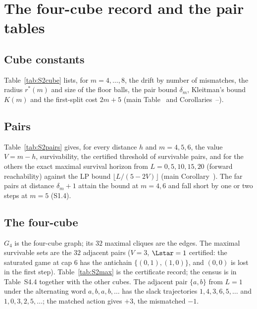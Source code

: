 \section{The four-cube record and the pair tables}\label{S:four}

\subsection{Cube constants}
Table~\ref{tab:S2cube} lists, for $m=4,\dots,8$, the drift by number of mismatches, the radius $r^\ast(m)$ and size of the floor balls, the pair bound $\delta_m$, Kleitman's bound $K(m)$ and the first-split cost $2m+5$ (main Table~ and Corollaries~--).
\begin{table}[H]\centering\small
\caption{Cube constants.}\label{tab:S2cube}

\end{table}

\subsection{Pairs}
Table~\ref{tab:S2pairs} gives, for every distance $h$ and $m=4,5,6$, the value $V=m-h$, survivability, the certified threshold of survivable pairs, and for the others the exact maximal survival horizon from $L=0,5,10,15,20$ (forward reachability) against the LP bound $\lfloor L/(5-2V)\rfloor$ (main Corollary~). The far pairs at distance $\delta_m+1$ attain the bound at $m=4,6$ and fall short by one or two steps at $m=5$ (S1.4).
\begin{table}[H]\centering\scriptsize
\caption{Pairs by distance: value, threshold, exact horizon versus LP bound.}\label{tab:S2pairs}

\end{table}

\subsection{The four-cube}
$G_4$ is the four-cube graph; its $32$ maximal cliques are the edges. The maximal survivable sets are the $32$ adjacent pairs ($V=3$, $\Lstar=1$ certified: the saturated game at cap $6$ has the antichain $\{(0,1),(1,0)\}$, and $(0,0)$ is lost in the first step). Table~\ref{tab:S2max} is the certificate record; the census is in Table~S4.4 together with the other cubes. The adjacent pair $\{a,b\}$ from $L=1$ under the alternating word $a,b,a,b,\dots$ has the slack trajectories $1,4,3,6,5,\dots$ and $1,0,3,2,5,\dots$; the matched action gives $+3$, the mismatched $-1$.
\begin{table}[H]\centering\small
\caption{Four-cube maximal survivable orbits with certificates.}\label{tab:S2max}

\end{table}
